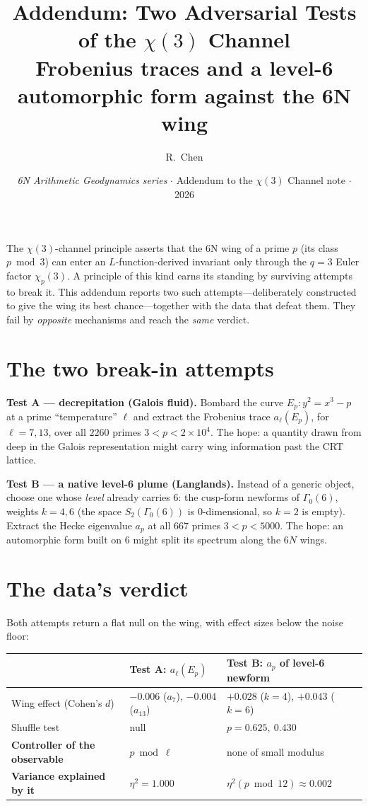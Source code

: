 \documentclass[11pt]{article}
\title{\textbf{Addendum: Two Adversarial Tests of the $\chi(3)$ Channel}\\
\large Frobenius traces and a level-6 automorphic form against the 6N wing}
\author{R.\ Chen}
\affil{GUT Geoservice Inc., Montr\'eal}
\date{\textit{6N Arithmetic Geodynamics series} $\cdot$ Addendum to the $\chi(3)$ Channel note $\cdot$ 2026}
\begin{document}
\maketitle

\noindent
The $\chi(3)$-channel principle asserts that the 6N wing of a prime $p$ (its class $p\bmod 3$) can
enter an $L$-function-derived invariant only through the $q=3$ Euler factor $\chi_p(3)$. A principle
of this kind earns its standing by surviving attempts to break it. This addendum reports two such
attempts---deliberately constructed to give the wing its best chance---together with the data that
defeat them. They fail by \emph{opposite} mechanisms and reach the \emph{same} verdict.

\section*{The two break-in attempts}
\textbf{Test A --- decrepitation (Galois fluid).} Bombard the curve $E_p : y^2 = x^3 - p$ at a prime
``temperature'' $\ell$ and extract the Frobenius trace $a_\ell(E_p)$, for $\ell = 7, 13$, over all
$2260$ primes $3 < p < 2\times10^4$. The hope: a quantity drawn from deep in the Galois representation
might carry wing information past the CRT lattice.

\noindent\textbf{Test B --- a native level-6 plume (Langlands).} Instead of a generic object, choose
one whose \emph{level} already carries $6$: the cusp-form newforms of $\Gamma_0(6)$, weights $k=4,6$
(the space $S_2(\Gamma_0(6))$ is $0$-dimensional, so $k=2$ is empty). Extract the Hecke eigenvalue
$a_p$ at all $667$ primes $3 < p < 5000$. The hope: an automorphic form built on $6$ might split its
spectrum along the $6N$ wings.

\section*{The data's verdict}
Both attempts return a flat null on the wing, with effect sizes below the noise floor:

\begin{table}[h]
\centering
\begin{tabular}{lll}
\toprule
 & Test A: $a_\ell(E_p)$ & Test B: $a_p$ of level-6 newform \\
\midrule
Wing effect (Cohen's $d$) & $-0.006$ ($a_7$), $-0.004$ ($a_{13}$) & $+0.028$ ($k{=}4$), $+0.043$ ($k{=}6$) \\
Shuffle test & null & $p = 0.625,\ 0.430$ \\
\textbf{Controller of the observable} & $p \bmod \ell$ & none of small modulus \\
\textbf{Variance explained by it} & $\eta^2 = 1.000$ & $\eta^2(p \bmod 12) \approx 0.002$ \\
\bottomrule
\end{tabular}
\end{table}
\end{document}
